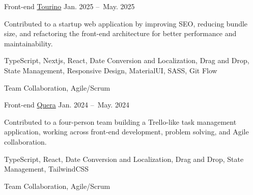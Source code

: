 \begin{cventries}
\cventry
{Front-end}
{\href{https://tourino.app/}{Tourino}}
{}
{Jan. 2025 --\ May. 2025}
{
	\begin{cvitems}
    \item {Contributed to a startup web application by improving SEO, reducing bundle size, and refactoring the front-end architecture for better performance and maintainability.}
		\item {TypeScript, Nextjs, React, Date Conversion and Localization, Drag and Drop, State Management, Responsive Design, MaterialUI, SASS, Git Flow}
    \item {Team Collaboration, Agile/Scrum}
  \end{cvitems}
}

\cventry
{Front-end}
{\href{https://quera.org/}{Quera}}
{}
{Jan. 2024 --\ May. 2024}
{
	\begin{cvitems}
    \item {Contributed to a four-person team building a Trello-like task management application, working across front-end development, problem solving, and Agile collaboration.}
    \item {TypeScript, React, Date Conversion and Localization, Drag and Drop, State Management, TailwindCSS}
    \item {Team Collaboration, Agile/Scrum}
  \end{cvitems}
}

\end{cventries}